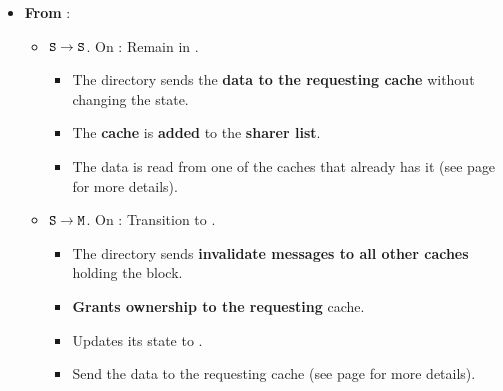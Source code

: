 \begin{itemize}
    \item \textbf{From }:
    \begin{itemize}
        \item $\texttt{S} \to \texttt{S}$. On : Remain in .
        \begin{itemize}
            \item The directory sends the \textbf{data to the requesting cache} without changing the state.
            \item The \textbf{cache} is \textbf{added} to the \textbf{sharer list}.
            \item The data is read from one of the caches that already has it (see page  for more details).
        \end{itemize}
        \item $\texttt{S} \to \texttt{M}$. On : Transition to .
        \begin{itemize}
            \item The directory sends \textbf{invalidate messages to all other caches} holding the block.
            \item \textbf{Grants ownership to the requesting} cache.
            \item Updates its state to .
            \item Send the data to the requesting cache (see page  for more details).
        \end{itemize}
    \end{itemize}


\end{itemize}
